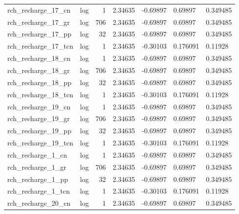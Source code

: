 \documentclass{article}
\begin{document}
\begin{center}
\begin{landscape}
\begin{longtable}{llrllll}
 rch\_recharge\_17\_cn &       log &      1 &        2.34635 &       -0.69897 &        0.69897 &           0.349485 \\
 rch\_recharge\_17\_gr &       log &    706 &        2.34635 &       -0.69897 &        0.69897 &           0.349485 \\
 rch\_recharge\_17\_pp &       log &     32 &        2.34635 &       -0.69897 &        0.69897 &           0.349485 \\
rch\_recharge\_17\_tcn &       log &      1 &        2.34635 &       -0.30103 &       0.176091 &            0.11928 \\
 rch\_recharge\_18\_cn &       log &      1 &        2.34635 &       -0.69897 &        0.69897 &           0.349485 \\
 rch\_recharge\_18\_gr &       log &    706 &        2.34635 &       -0.69897 &        0.69897 &           0.349485 \\
 rch\_recharge\_18\_pp &       log &     32 &        2.34635 &       -0.69897 &        0.69897 &           0.349485 \\
rch\_recharge\_18\_tcn &       log &      1 &        2.34635 &       -0.30103 &       0.176091 &            0.11928 \\
 rch\_recharge\_19\_cn &       log &      1 &        2.34635 &       -0.69897 &        0.69897 &           0.349485 \\
 rch\_recharge\_19\_gr &       log &    706 &        2.34635 &       -0.69897 &        0.69897 &           0.349485 \\
 rch\_recharge\_19\_pp &       log &     32 &        2.34635 &       -0.69897 &        0.69897 &           0.349485 \\
rch\_recharge\_19\_tcn &       log &      1 &        2.34635 &       -0.30103 &       0.176091 &            0.11928 \\
  rch\_recharge\_1\_cn &       log &      1 &        2.34635 &       -0.69897 &        0.69897 &           0.349485 \\
  rch\_recharge\_1\_gr &       log &    706 &        2.34635 &       -0.69897 &        0.69897 &           0.349485 \\
  rch\_recharge\_1\_pp &       log &     32 &        2.34635 &       -0.69897 &        0.69897 &           0.349485 \\
 rch\_recharge\_1\_tcn &       log &      1 &        2.34635 &       -0.30103 &       0.176091 &            0.11928 \\
 rch\_recharge\_20\_cn &       log &      1 &        2.34635 &       -0.69897 &        0.69897 &           0.349485 \\

\end{longtable}
\end{landscape}
\end{center}
\end{document}
